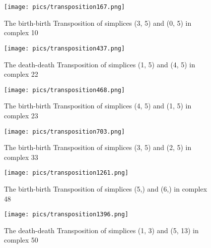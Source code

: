 \documentclass{article}
\begin{document}
\begin{figure}[ht]
\centering
\texttt{[image: pics/transposition167.png]}
\caption{The birth-birth Transposition of simplices (3, 5) and (0, 5) in complex 10}
\label{fig:unexpected167}
\end{figure}

\begin{figure}[ht]
\centering
\texttt{[image: pics/transposition437.png]}
\caption{The death-death Transposition of simplices (1, 5) and (4, 5) in complex 22}
\label{fig:unexpected437}
\end{figure}

\begin{figure}[ht]
\centering
\texttt{[image: pics/transposition468.png]}
\caption{The birth-birth Transposition of simplices (4, 5) and (1, 5) in complex 23}
\label{fig:unexpected468}
\end{figure}

\begin{figure}[ht]
\centering
\texttt{[image: pics/transposition703.png]}
\caption{The birth-birth Transposition of simplices (3, 5) and (2, 5) in complex 33}
\label{fig:unexpected703}
\end{figure}

\begin{figure}[ht]
\centering
\texttt{[image: pics/transposition1261.png]}
\caption{The birth-birth Transposition of simplices (5,) and (6,) in complex 48}
\label{fig:unexpected1261}
\end{figure}

\begin{figure}[ht]
\centering
\texttt{[image: pics/transposition1396.png]}
\caption{The death-death Transposition of simplices (1, 3) and (5, 13) in complex 50}
\label{fig:unexpected1396}
\end{figure}
\end{document}
